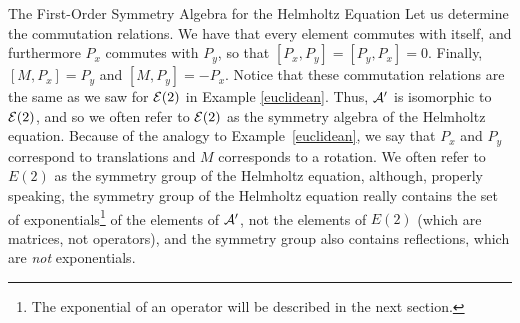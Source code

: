 \begin{section}{The First-Order Symmetry Algebra for the Helmholtz Equation}
Let us determine the commutation relations.  We have that every element commutes with itself, and furthermore $P_x$ commutes with $P_y$, so that $[P_x,P_y] = [P_y,P_x] = 0$.  Finally, $[M,P_x] = P_y$ and $[M,P_y] = -P_x$.  Notice that these commutation relations are the same as we saw for $\mathcal{E}(2)$ in Example \ref{euclidean}.  Thus, $\mathcal{A}^\prime$ is isomorphic to $\mathcal{E}(2)$, and so we often refer to $\mathcal{E}(2)$ as the symmetry algebra of the Helmholtz equation.  Because of the analogy to Example~\ref{euclidean}, we say that $P_x$ and $P_y$ correspond to translations and $M$ corresponds to a rotation.  We often refer to $E(2)$ as the symmetry group of the Helmholtz equation, although, properly speaking,  the symmetry group of the Helmholtz equation really contains the set of exponentials\footnote{The exponential of an operator will be described in the next section.} of the elements of $\mathcal{A}^\prime$, not the elements of $E(2)$ (which are matrices, not operators), and  the symmetry group also contains reflections, which are \emph{not} exponentials.

\end{section}

